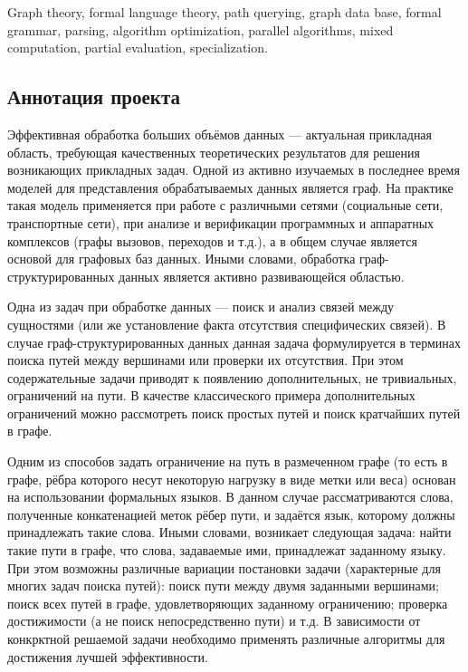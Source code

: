 \documentclass[12pt]{article}  %
\theoremstyle{remark}
\begin{document}
Graph theory, formal language theory, path querying, graph data base, formal grammar, parsing, algorithm optimization, parallel algorithms, mixed computation, partial evaluation, specialization.



\subsection{Аннотация проекта}
Эффективная обработка больших объёмов данных --- актуальная прикладная область, требующая качественных теоретических результатов для решения возникающих прикладных задач.
Одной из активно изучаемых в последнее время моделей для представления обрабатываемых данных является граф.
На практике такая модель применяется при работе с различными сетями (социальные сети, транспортные сети), при анализе и верификации программных и аппаратных комплексов (графы вызовов, переходов и т.д.), а в общем случае является основой для графовых баз данных.
Иными словами, обработка граф-структурированных данных является активно развивающейся областью.

Одна из задач при обработке данных --- поиск и анализ связей между сущностями (или же установление факта отсутствия специфических связей).
В случае граф-структурированных данных данная задача формулируется в терминах поиска путей между вершинами или проверки их отсутствия.
При этом содержательные задачи приводят к появлению дополнительных, не тривиальных, ограничений на пути.
В качестве классического примера дополнительных ограничений можно рассмотреть поиск простых путей и поиск кратчайших путей в графе.

Одним из способов задать ограничение на путь в размеченном графе (то есть в графе, рёбра которого несут некоторую нагрузку в виде метки или веса) основан на использовании формальных языков.
В данном случае рассматриваются слова, полученные конкатенацией меток рёбер пути, и задаётся язык, которому должны принадлежать такие слова.
Иными словами, возникает следующая задача: найти такие пути в графе, что слова, задаваемые ими, принадлежат заданному языку.
При этом возможны различные вариации постановки задачи (характерные для многих задач поиска путей): поиск пути между двумя заданными вершинами; поиск всех путей в графе, удовлетворяющих заданному ограничению; проверка достижимости (а не поиск непосредственно пути) и т.д.
В зависимости от конкрктной решаемой задачи необходимо применять различные алгоритмы для достижения лучшей эффективности.
\end{document}
